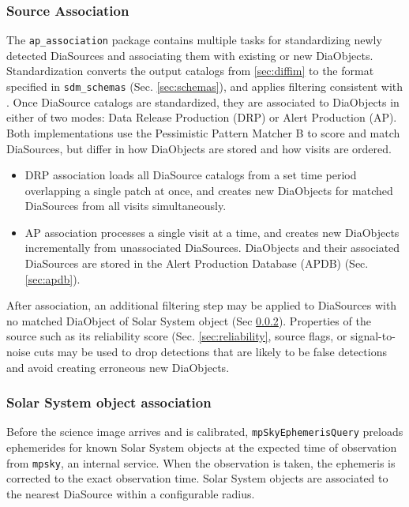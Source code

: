 \subsubsection{Source Association}
\label{sec:association}

The \texttt{ap\_association} package contains multiple tasks for standardizing newly detected DiaSources and associating them with existing or new DiaObjects.
Standardization converts the output catalogs from \ref{sec:diffim} to the format specified in \texttt{sdm\_schemas} (Sec. \ref{sec:schemas}), and applies filtering consistent with \citep{DMTN-199}.
Once DiaSource catalogs are standardized, they are associated to DiaObjects in either of two modes: Data Release Production (DRP) or Alert Production (AP).
Both implementations use the Pessimistic Pattern Matcher B \citep{DMTN-031} to score and match DiaSources, but differ in how DiaObjects are stored and how visits are ordered.

\begin{itemize}
\item DRP association loads all DiaSource catalogs from a set time period overlapping a single patch at once, and creates new DiaObjects for matched DiaSources from all visits simultaneously.
\item AP association processes a single visit at a time, and creates new DiaObjects incrementally from unassociated DiaSources.
DiaObjects and their associated DiaSources are stored in the Alert Production Database (APDB) (Sec. \ref{sec:apdb}).
\end{itemize}

After association, an additional filtering step may be applied to DiaSources with no matched DiaObject of Solar System object (Sec \ref{sec:solar}).
Properties of the source such as its reliability score (Sec. \ref{sec:reliability}, source flags, or signal-to-noise cuts may be used to drop detections that are likely to be false detections and avoid creating erroneous new DiaObjects.

\subsubsection{Solar System object association}
\label{sec:solar}

Before the science image arrives and is calibrated, \texttt{mpSkyEphemerisQuery} preloads ephemerides for known Solar System objects at the expected time of observation from \texttt{mpsky}, an internal service.
When the observation is taken, the ephemeris is corrected to the exact observation time.
Solar System objects are associated to the nearest DiaSource within a configurable radius.

